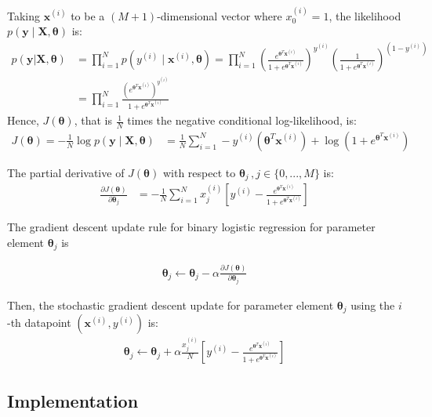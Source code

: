 \documentclass[11pt,addpoints,answers]{exam}
\newcommand{\xv}{\mathbf{x}}
\newcommand{\yv}{\mathbf{y}}
\newcommand{\thetav     }{\boldsymbol \theta     }
\begin{document}
Taking $\xv^{\left(i\right)}$ to be a $(M+1)$-dimensional vector where $x^{(i)}_0=1$, the likelihood $p\left(\yv \mid \mathbf{X},\thetav\right)$ is:
\begin{align}
     p(\yv |\mathbf{X},\thetav) &= \prod_{i = 1}^N p(y^{(i)} \mid  \xv^{(i)}, \thetav) = \prod_{i = 1}^N \left(\frac{e^{\thetav^T\xv^{\left(i\right)}}}{1+e^{\thetav^T\xv^{\left(i\right)}}}\right)^{y^{(i)}}\left(\frac{1}{1+e^{\thetav^T\xv^{\left(i\right)}}}\right)^{\left(1-y^{(i)}\right)}\\
    &= \prod_{i=1}^N \frac{\left(e^{\thetav^T\xv^{\left(i\right)}}\right)^{y^{(i)}}}{1+e^{\thetav^T\xv^{\left(i\right)}}}
\end{align}
Hence, $J(\thetav)$, that is $\frac{1}{N}$ times the negative conditional log-likelihood, is:
\begin{align}
    J(\thetav)= - \frac{1}{N} \log p\left(\yv \mid \mathbf{X},\thetav\right) &= \frac{1}{N}\sum_{i=1}^N  -y^{(i)}\left(\thetav^T\xv^{\left(i\right)}\right)+\log\left(1+e^{\thetav^T\xv^{\left(i\right)}}\right)
\end{align}


The partial derivative of $J(\thetav)$ with respect to $\thetav_j \,, j\in\{0,...,M\}$ is:
\begin{align}
    \frac{\partial J(\thetav)}{\partial \thetav_j} &= -\frac{1}{N} \sum_{i=1}^N x_j^{\left(i\right)}\left[y^{(i)}-\frac{e^{\thetav^T\xv^{\left(i\right)}}}{1+e^{\thetav^T\xv^{\left(i\right)}}}\right]
\end{align}


The gradient descent update rule  for binary logistic regression for parameter element $\thetav_j$ is

\begin{align}
    \thetav_j \leftarrow \thetav_j - \alpha \frac{\partial J(\thetav)}{\partial \thetav_j}
\end{align}


Then, the stochastic gradient descent update for  parameter element $\thetav_j$ using the $i$-th datapoint $(\xv^{(i)},y^{(i)})$ is:
\begin{align}
    \thetav_j \leftarrow \thetav_j + \alpha \frac{x_j^{\left(i\right)}}{N} \left[y^{(i)}-\frac{e^{\thetav^T\xv^{\left(i\right)}}}{1+e^{\thetav^T\xv^{\left(i\right)}}}\right]
\end{align}
 


\subsection{Implementation}
\end{document}
